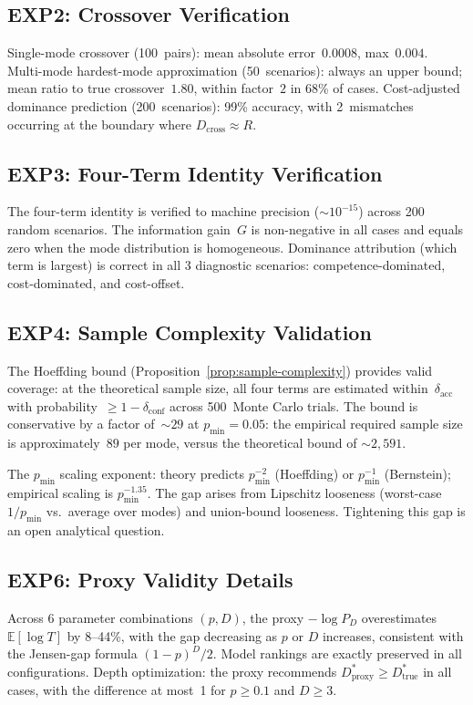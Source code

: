 \documentclass[twoside,11pt]{article}
\newcommand{\E}{\mathbb{E}}
\newcommand{\pmin}{p_{\min}}
\newcommand{\dacc}{\delta_{\mathrm{acc}}}
\newcommand{\dconf}{\delta_{\mathrm{conf}}}
\newcommand{\Dstar}{D^*}
\newcommand{\Dcross}{D_{\mathrm{cross}}}
\begin{document}
\subsection{EXP2: Crossover Verification}

Single-mode crossover (100~pairs): mean absolute error~$0.0008$, max~$0.004$.
Multi-mode hardest-mode approximation (50~scenarios): always an upper bound; mean ratio to true crossover~$1.80$, within factor~$2$ in 68\% of cases.
Cost-adjusted dominance prediction (200~scenarios): 99\% accuracy, with 2~mismatches occurring at the boundary where $\Dcross \approx R$.

\subsection{EXP3: Four-Term Identity Verification}

The four-term identity is verified to machine precision ($\sim 10^{-15}$) across 200 random scenarios.
The information gain~$G$ is non-negative in all cases and equals zero when the mode distribution is homogeneous.
Dominance attribution (which term is largest) is correct in all 3 diagnostic scenarios: competence-dominated, cost-dominated, and cost-offset.

\subsection{EXP4: Sample Complexity Validation}

The Hoeffding bound (Proposition~\ref{prop:sample-complexity}) provides valid coverage: at the theoretical sample size, all four terms are estimated within~$\dacc$ with probability~$\ge 1 - \dconf$ across 500~Monte Carlo trials.
The bound is conservative by a factor of~$\sim 29$ at $\pmin = 0.05$: the empirical required sample size is approximately~$89$ per mode, versus the theoretical bound of $\sim 2{,}591$.

The $\pmin$ scaling exponent: theory predicts $\pmin^{-2}$ (Hoeffding) or $\pmin^{-1}$ (Bernstein); empirical scaling is $\pmin^{-1.35}$.
The gap arises from Lipschitz looseness (worst-case $1/\pmin$ vs.\ average over modes) and union-bound looseness.
Tightening this gap is an open analytical question.

\subsection{EXP6: Proxy Validity Details}

Across 6 parameter combinations $(p, D)$, the proxy $-\log P_D$ overestimates $\E[\log T]$ by 8--44\%, with the gap decreasing as $p$ or $D$ increases, consistent with the Jensen-gap formula $(1-p)^D/2$.
Model rankings are exactly preserved in all configurations.
Depth optimization: the proxy recommends $\Dstar_{\mathrm{proxy}} \ge \Dstar_{\mathrm{true}}$ in all cases, with the difference at most~1 for $p \ge 0.1$ and $D \ge 3$.
\end{document}
